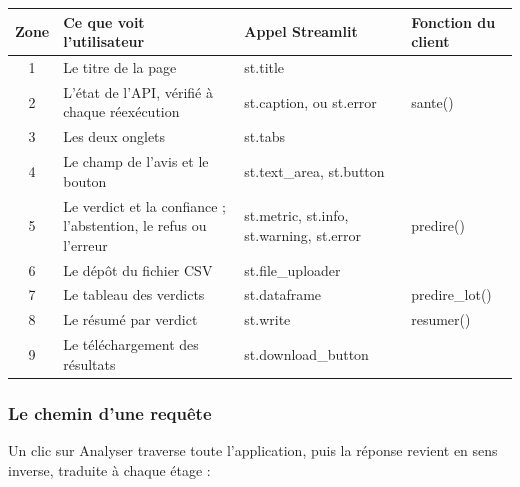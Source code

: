 \documentclass[11pt,a4paper]{article}
\newcommand{\co}[1]{{\ttfamily\hyphenchar\font=45\relax #1}}
\begin{document}
\begin{center}
\small
\begin{tabularx}{\textwidth}{@{}c >{\raggedright\arraybackslash}X >{\raggedright\arraybackslash}p{5.2cm} l@{}}
\toprule
\textbf{Zone} & \textbf{Ce que voit l'utilisateur} & \textbf{Appel Streamlit} & \textbf{Fonction du client} \\
\midrule
1 & Le titre de la page & \co{st.title} & \\
2 & L'état de l'API, vérifié à chaque réexécution & \co{st.caption}, ou \co{st.error} & \co{sante()} \\
3 & Les deux onglets & \co{st.tabs} & \\
4 & Le champ de l'avis et le bouton & \co{st.text\_area}, \co{st.button} & \\
5 & Le verdict et la confiance ; l'abstention, le refus ou l'erreur & \co{st.metric}, \co{st.info}, \co{st.warning}, \co{st.error} & \co{predire()} \\
6 & Le dépôt du fichier CSV & \co{st.file\_uploader} & \\
7 & Le tableau des verdicts & \co{st.dataframe} & \co{predire\_lot()} \\
8 & Le résumé par verdict & \co{st.write} & \co{resumer()} \\
9 & Le téléchargement des résultats & \co{st.download\_button} & \\
\bottomrule
\end{tabularx}
\end{center}

\subsubsection{Le chemin d'une requête}

Un clic sur \og Analyser \fg{} traverse toute l'application, puis la réponse revient en sens inverse, traduite
à chaque étage :
\end{document}
